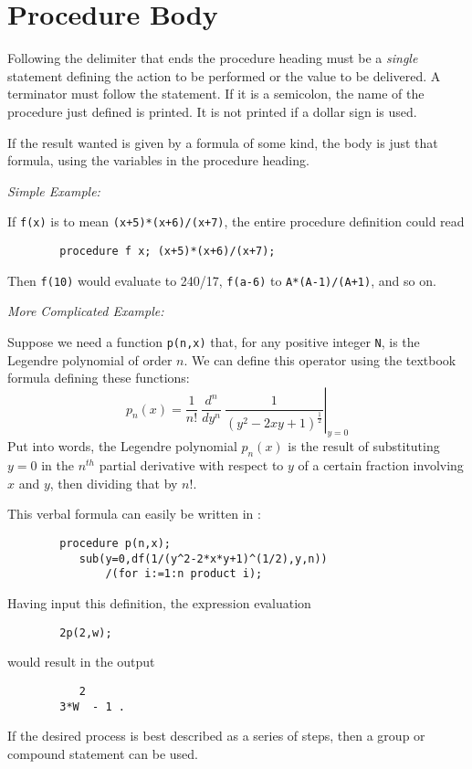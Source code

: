 \section{Procedure Body}

Following the delimiter that ends the procedure heading must be a 
\emph{single} statement defining the action to be performed or the value to be
delivered.  A terminator must follow the statement.  If it is a semicolon,
the name of the procedure just defined is printed.  It is not printed if a
dollar sign is used.

If the result wanted is given by a formula of some kind, the body is just
that formula, using the variables in the procedure heading.

\textit{Simple Example:}

If \texttt{f(x)} is to mean \texttt{(x+5)*(x+6)/(x+7)}, the entire procedure
definition could read
\begin{verbatim}
        procedure f x; (x+5)*(x+6)/(x+7);
\end{verbatim}
Then \texttt{f(10)} would evaluate to 240/17, \texttt{f(a-6)} to
\texttt{A*(A-1)/(A+1)}, and so on.

\textit{More Complicated Example:}

Suppose we need a function \texttt{p(n,x)} that, for any positive integer
\texttt{N}, is the Legendre polynomial of order
$n$. We can define this operator using the
textbook formula defining these functions:
\begin{displaymath}
p_n(x) = \left.\frac{1}{n!}\  
\frac{{d}^n}{dy^n}\ \frac{1}{{(y^2 - 2xy + 1)}^{\frac{1}{2}}}\right\vert_{y=0}
\end{displaymath}
Put into words, the Legendre polynomial $p_n(x)$ is the result of
substituting $y=0$ in the $n^{th}$ partial derivative with respect to $y$
of a certain fraction involving $x$ and $y$, then dividing that by $n!$.

This verbal formula can easily be written in {\REDUCE}:
\begin{verbatim}
        procedure p(n,x);
           sub(y=0,df(1/(y^2-2*x*y+1)^(1/2),y,n))
               /(for i:=1:n product i);
\end{verbatim}
Having input this definition, the expression evaluation
\begin{verbatim}
        2p(2,w);
\end{verbatim}
would result in the output
\begin{verbatim}
           2
        3*W  - 1 .
\end{verbatim}
If the desired process is best described as a series of steps, then a group
or compound statement can be used.

